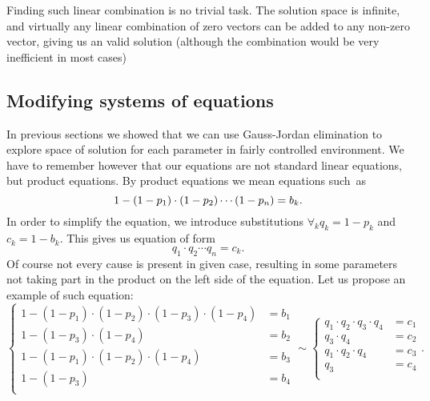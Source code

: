 Finding such linear combination is no trivial task.
The solution space is infinite, and virtually any linear combination of zero vectors can be added to any non-zero vector, giving us an valid solution (although the combination would be very inefficient in most cases)

\subsection{Modifying systems of equations}
In previous sections we showed that we can use Gauss-Jordan elimination to explore space of solution for each parameter in fairly controlled environment.
We have to remember however that our equations are not standard linear equations, but product equations.
By product equations we mean equations such~as
\begin{equation}
    1 - (1-p_1)\cdot(1-p_2) \cdots (1-p_n) = b_k.\\
\end{equation}
In order to simplify the equation, we introduce substitutions $\forall_kq_k = 1 - p_k$ and $c_k = 1 - b_k$.
This gives us equation of form
\begin{equation}
    q_1 \cdot q_2 \cdots q_n = c_k.
\end{equation}
Of course not every cause is present in given case, resulting in some parameters not taking part in the product on the left side of the equation.
Let us propose an example of such equation:
\begin{equation}
\begin{cases}
    1 - (1-p_1) \cdot (1-p_2) \cdot (1-p_3) \cdot (1-p_4) &= b_1\\
    1 - (1-p_3) \cdot (1-p_4) & = b_2\\
    1 - (1-p_1) \cdot (1-p_2) \cdot (1-p_4) & = b_3\\
    1 - (1-p_3) & = b_4\\
\end{cases}
\sim
\begin{cases}
    q_1 \cdot q_2 \cdot q_3 \cdot q_4 &= c_1\\
    q_3 \cdot q_4 &= c_2\\
    q_1 \cdot q_2 \cdot q_4 &= c_3\\
    q_3 &= c_4\\
\end{cases}.
\end{equation}

